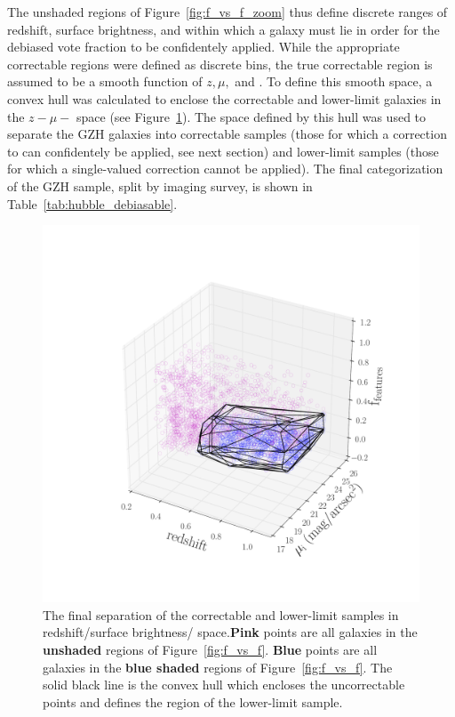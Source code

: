 The unshaded regions of Figure~\ref{fig:f_vs_f_zoom} thus define discrete ranges of redshift, surface brightness, and \ffeatures{} within which a galaxy must lie in order for the debiased vote fraction to be confidentely applied. While the appropriate correctable regions were defined as discrete bins, the true correctable region is assumed to be a smooth function of $z, \mu,$ and \ffeatures{}. To define this smooth space, a convex hull was calculated to enclose the correctable and lower-limit \ferengi{} galaxies in the $z-\mu-$\ffeatures{} space (see Figure~\ref{fig:hull}). The space defined by this hull was used to separate the GZH galaxies into correctable samples (those for which a correction to \ffeatures{} can confidentely be applied, see next section) and lower-limit samples (those for which a single-valued correction cannot be applied). The final categorization of the GZH sample, split by imaging survey, is shown in Table~\ref{tab:hubble_debiasable}. 
\begin{figure}
\centering
\includegraphics[width=\textwidth]{figures/convex_hull.pdf}
\caption{The final separation of the correctable and lower-limit samples in redshift/surface brightness/\ffeatures{} space.\textbf{Pink} points are all \ferengi{} galaxies in the \textbf{unshaded} regions of Figure~\ref{fig:f_vs_f}. \textbf{Blue} points are all \ferengi{} galaxies in the \textbf{blue shaded} regions of Figure~\ref{fig:f_vs_f}. The solid black line is the convex hull which encloses the uncorrectable points and defines the region of the lower-limit sample. }
\label{fig:hull}
\end{figure}



